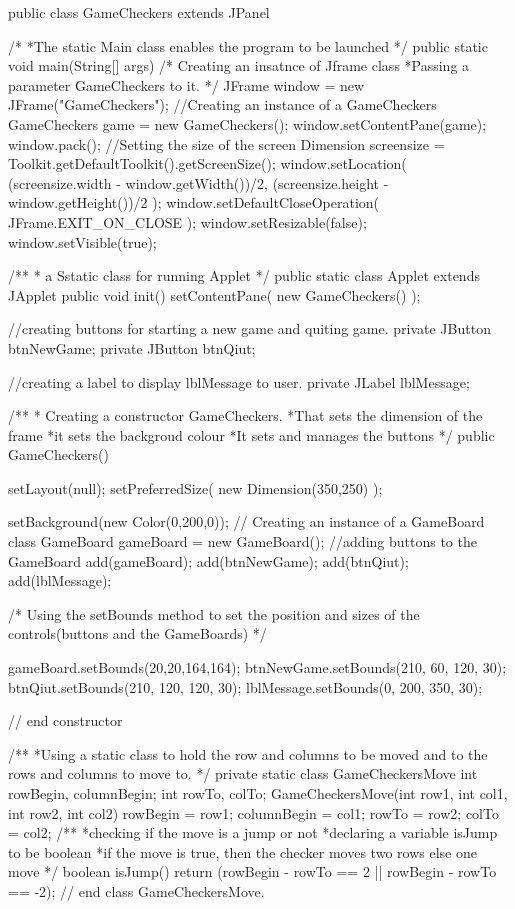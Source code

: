 \documentclass[10pt, a4paper]{article}
\begin{document}
public class GameCheckers extends JPanel {
   /*
   *The static Main class enables the program to be launched
   */
   public static void main(String[] args) {
	   /* Creating an insatnce of Jframe class
	   *Passing a parameter GameCheckers to it.
	   */
      JFrame window = new JFrame("GameCheckers");
	  //Creating an instance of a GameCheckers
      GameCheckers game = new GameCheckers();
      window.setContentPane(game);
      window.pack();
	  //Setting the size of the screen
      Dimension screensize = Toolkit.getDefaultToolkit().getScreenSize();
      window.setLocation( (screensize.width - window.getWidth())/2,
            (screensize.height - window.getHeight())/2 );
      window.setDefaultCloseOperation( JFrame.EXIT_ON_CLOSE );
      window.setResizable(false);
      window.setVisible(true);
   }

   /**
    * a Sstatic class for running Applet
    */
   public static class Applet extends JApplet {
      public void init() {
         setContentPane( new GameCheckers() );
      }
   }

   //creating buttons for starting a new game and quiting game.
   private JButton btnNewGame;
   private JButton btnQiut;

   //creating a label to display lblMessage to user.
   private JLabel lblMessage;

   /**
    * Creating a constructor GameCheckers.
	*That sets the dimension of the frame
	*it sets the backgroud colour
	*It sets and manages the buttons
    */
   public GameCheckers() {
      setLayout(null);
      setPreferredSize( new Dimension(350,250) );

      setBackground(new Color(0,200,0));
      // Creating an instance of a GameBoard class
      GameBoard gameBoard = new GameBoard();
	  //adding buttons to the GameBoard
      add(gameBoard);
      add(btnNewGame);
      add(btnQiut);
      add(lblMessage);

      /* Using the setBounds method to set the position and sizes of the controls(buttons and the GameBoards) */

      gameBoard.setBounds(20,20,164,164);
      btnNewGame.setBounds(210, 60, 120, 30);
      btnQiut.setBounds(210, 120, 120, 30);
      lblMessage.setBounds(0, 200, 350, 30);

   }
// end constructor

/**
	*Using a static class to hold the row and columns to be moved and to the rows and columns to move to.
	*/
   private static class GameCheckersMove {
      int rowBegin, columnBegin;
      int rowTo, colTo;
      GameCheckersMove(int row1, int col1, int row2, int col2) {
         rowBegin = row1;
         columnBegin = col1;
         rowTo = row2;
         colTo = col2;
      }
	  /**
	  *checking if the move is a jump or not
	  *declaring a variable isJump to be boolean
	  *if the move is true, then the checker moves two rows
	  else one move
	  */
      boolean isJump() {
         return (rowBegin - rowTo == 2 || rowBegin - rowTo == -2);
      }
   }  // end class GameCheckersMove.

}
\end{document}
